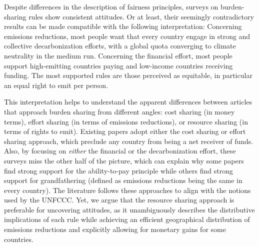 Despite differences in the description of fairness principles, surveys on burden-sharing rules show consistent attitudes. Or at least, their seemingly contradictory results can be made compatible with the following interpretation: 
Concerning emissions reductions, most people want that every country engage in strong and collective decarbonization efforts, with a global quota converging to climate neutrality in the medium run. Concerning the financial effort, most people support high-emitting countries paying and low-income countries receiving funding. The most supported rules are those perceived as equitable, in particular an equal right to emit per person. 

This interpretation helps to understand the apparent differences between articles that approach burden sharing from different angles: cost sharing (in money terms), effort sharing (in terms of emissions reductions), or resource sharing (in terms of rights to emit). Existing papers adopt either the cost sharing or effort sharing approach, which preclude any country from being a net receiver of funds. Also, by focusing on \textit{either} the financial or the decarbonization effort, these surveys miss the other half of the picture, which can explain why some papers find strong support for the ability-to-pay principle while others find strong support for grandfathering (defined as emissions reductions being the same in every country). The literature follows these approaches to align with the notions used by the UNFCCC. Yet, we argue that the resource sharing approach is preferable for uncovering attitudes, as it unambiguously describes the distributive implications of each rule while achieving an efficient geographical distribution of emissions reductions and explicitly allowing for monetary gains for some countries. %

